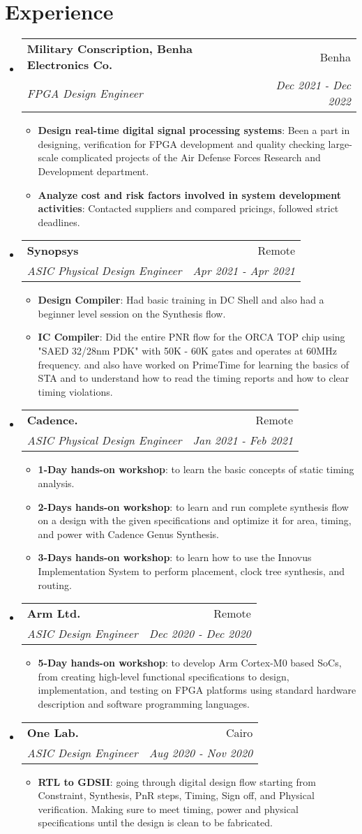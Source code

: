 \documentclass[a4paper,20pt]{article}
\makeatletter
\newcommand{\resumeItem}[2]{
  \item\small{
    \textbf{#1}{: #2 \vspace{-2pt}}
  }
}
\newcommand{\resumeSubheading}[4]{
  \vspace{-1pt}\item
    \begin{tabular*}{0.97\textwidth}{l@{\extracolsep{\fill}}r}
      \textbf{#1} & #2 \\
      \textit{#3} & \textit{#4} \\
    \end{tabular*}\vspace{-5pt}
}
\newcommand{\resumeSubHeadingListStart}{\begin{itemize}[leftmargin=*]}
\newcommand{\resumeSubHeadingListEnd}{\end{itemize}}
\newcommand{\resumeItemListStart}{\begin{itemize}}
\newcommand{\resumeItemListEnd}{\end{itemize}\vspace{-5pt}}
\makeatother
\begin{document}
\section{Experience}
  \resumeSubHeadingListStart
  \resumeSubheading{Military Conscription, Benha Electronics Co.}{Benha}
  {FPGA Design Engineer}{Dec 2021 - Dec 2022}
  \resumeItemListStart
  \resumeItem{Design real-time digital signal processing systems}
  {Been a part in designing, verification for FPGA development and quality checking large-scale complicated projects of the Air Defense Forces Research and Development department.}
  \resumeItem{Analyze cost and risk factors involved in system development activities}
  {Contacted suppliers and compared pricings, followed strict deadlines.}
  \resumeItemListEnd
    \resumeSubheading{Synopsys}{Remote}
    {ASIC Physical Design Engineer}{Apr 2021 - Apr 2021}
    \resumeItemListStart
        \resumeItem{Design Compiler}
          {Had basic training in DC Shell and also had a beginner level session on the Synthesis flow.}
          \resumeItem{IC Compiler}
          {Did the entire PNR flow for the ORCA TOP chip using "SAED 32/28nm PDK" with 50K - 60K gates and operates at 60MHz frequency. and also have worked on PrimeTime for learning the basics of STA and to understand how to read the timing reports and how to clear timing violations.}
      \resumeItemListEnd
\vspace{-5pt}
    \resumeSubheading
		{Cadence.}{Remote}
		{ASIC Physical Design Engineer}{Jan 2021 - Feb 2021}
		\resumeItemListStart
        \resumeItem{1-Day hands-on workshop}
          {to learn the basic concepts of static timing analysis.}
        \resumeItem{2-Days hands-on workshop}
          {to learn and run complete synthesis flow on a design with the given specifications and optimize it for area, timing, and power with Cadence Genus Synthesis.}
        \resumeItem{3-Days hands-on workshop}{to learn how to use the Innovus Implementation System to perform placement, clock tree synthesis, and routing.}
		\resumeItemListEnd
		

\resumeSubheading
{Arm Ltd.}{Remote}
{ASIC Design Engineer}{Dec 2020 - Dec 2020}
\resumeItemListStart
\resumeItem{5-Day hands-on workshop}
{to develop Arm Cortex-M0 based SoCs, from creating high-level functional specifications to design, implementation, and testing on FPGA platforms using standard hardware description and software programming languages.}
\resumeItemListEnd
	\resumeSubheading {One Lab.}{Cairo}
{ASIC Design Engineer}{Aug 2020 - Nov 2020}
\resumeItemListStart
\resumeItem{RTL to GDSII}
{going through digital design flow starting from Constraint, Synthesis, PnR steps, Timing, Sign off, and Physical verification. Making sure to meet timing, power and physical specifications until the design is clean to be fabricated.}
\resumeItemListEnd
\resumeSubHeadingListEnd
\end{document}

